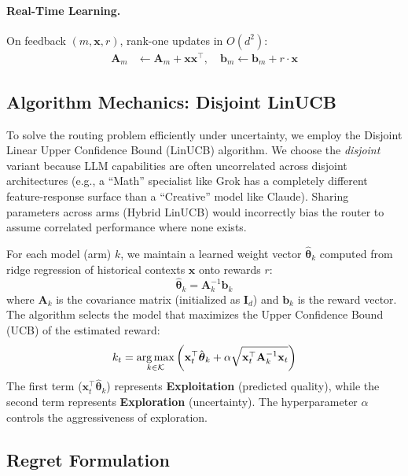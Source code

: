 \paragraph{Real-Time Learning.} On feedback $(m, \mathbf{x}, r)$, rank-one updates in $O(d^2)$:
\begin{align}
\mathbf{A}_m &\leftarrow \mathbf{A}_m + \mathbf{x}\mathbf{x}^\top, \quad
\mathbf{b}_m \leftarrow \mathbf{b}_m + r \cdot \mathbf{x}
\label{eq:update}
\end{align}

\subsection{Algorithm Mechanics: Disjoint LinUCB}
\label{sec:linucb}

To solve the routing problem efficiently under uncertainty, we employ the Disjoint Linear Upper Confidence Bound (LinUCB) algorithm. We choose the \emph{disjoint} variant because LLM capabilities are often uncorrelated across disjoint architectures (e.g., a ``Math'' specialist like Grok has a completely different feature-response surface than a ``Creative'' model like Claude). Sharing parameters across arms (Hybrid LinUCB) would incorrectly bias the router to assume correlated performance where none exists.

For each model (arm) $k$, we maintain a learned weight vector $\hat{\boldsymbol{\theta}}_k$ computed from ridge regression of historical contexts $\mathbf{x}$ onto rewards $r$:
\begin{equation}
\hat{\boldsymbol{\theta}}_k = \mathbf{A}_k^{-1} \mathbf{b}_k
\end{equation}
where $\mathbf{A}_k$ is the covariance matrix (initialized as $\mathbf{I}_d$) and $\mathbf{b}_k$ is the reward vector. The algorithm selects the model that maximizes the Upper Confidence Bound (UCB) of the estimated reward:
\begin{equation}
k_t = \operatorname*{arg\,max}_{k \in \mathcal{K}} \left( \mathbf{x}_t^\top \hat{\boldsymbol{\theta}}_k + \alpha \sqrt{\mathbf{x}_t^\top \mathbf{A}_k^{-1} \mathbf{x}_t} \right)
\end{equation}
The first term ($\mathbf{x}_t^\top \hat{\boldsymbol{\theta}}_k$) represents \textbf{Exploitation} (predicted quality), while the second term represents \textbf{Exploration} (uncertainty). The hyperparameter $\alpha$ controls the aggressiveness of exploration.

\subsection{Regret Formulation}
\label{sec:regret}


